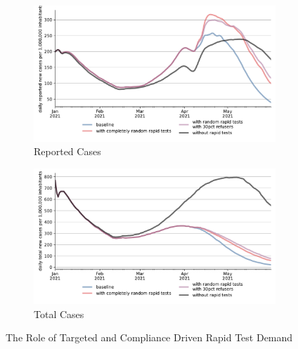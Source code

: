 \begin{figure}[ht] %
  \centering
  \begin{subfigure}[b]{.49\textwidth}
    \centering
    \includegraphics[width=0.9 \textwidth]{figures/results/figures/scenario_comparisons/random_rapid_tests_vs_baseline/full_new_known_case}
    \caption{Reported Cases}
    \label{fig:random_rapid_tests_new_known_case}
  \end{subfigure}%
  \hfill
  \begin{subfigure}[b]{.49\textwidth}
    \centering
    \includegraphics[width=0.9 \textwidth]{figures/results/figures/scenario_comparisons/random_rapid_tests_vs_baseline/full_newly_infected}
    \caption{Total Cases}
    \label{fig:random_rapid_tests_newly_infected}
  \end{subfigure}
  \caption{The Role of Targeted and Compliance Driven Rapid Test Demand}
  \label{fig:random_rapid_tests_detailed}
\end{figure}




\FloatBarrier
